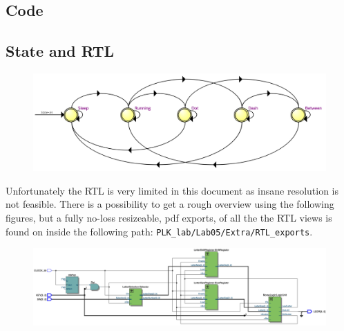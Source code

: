 \documentclass{article}
\begin{document}
\subsection{Code}

\clearpage
{}

\clearpage
{}

\clearpage
{}

\clearpage
{}


\clearpage
\subsection{State and RTL}

\begin{figure}[h]
    \centering
    \includegraphics[width=1\textwidth]{Figures/Part3_State.jpg}
    \label{fig:state}
\end{figure}

Unfortunately the RTL is very limited in this document as insane resolution is not feasible. There is a possibility to get a rough overview using the following figures, but a fully  no-loss resizeable,  pdf exports, of all the the RTL views is found on  
inside the following path: \verb|PLK_lab/Lab05/Extra/RTL_exports|.

\hfill

\begin{figure}[h]
    \centering
    \includegraphics[width=1\textwidth]{Figures/Part3_RTL_TLE.jpg}
    \label{fig:p3_RTL_TLE}
\end{figure}
\end{document}
